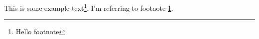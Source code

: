 \documentclass{article}
\begin{document}
This is some example text\footnote{\label{myfootnote}Hello footnote}.
I'm referring to footnote \ref{myfootnote}.
\end{document}
